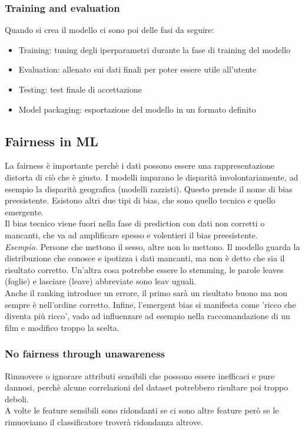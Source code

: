 \subsubsection{Training and evaluation}
Quando si crea il modello ci sono poi delle fasi da seguire:
\begin{itemize}
    \item Training: tuning degli iperparametri durante la fase di training del modello
    \item Evaluation: allenato sui dati finali per poter essere utile all'utente
    \item Testing: test finale di accettazione 
    \item Model packaging: esportazione del modello in un formato definito
\end{itemize}

\newpage

\subsection{Fairness in ML}
La fairness è importante perchè i dati possono essere una rappresentazione distorta di ciò che è giusto. I modelli imparano le disparità involontariamente, ad esempio la disparità geografica (modelli razzisti). Questo prende il nome di bias preesistente. Esistono altri due tipi di bias, che sono quello tecnico e quello emergente.
\\
Il bias tecnico viene fuori nella fase di prediction con dati non corretti o mancanti, che va ad amplificare spesso e volentieri il bias preesistente. \\
\textit{Esempio.} Persone che mettono il sesso, altre non lo mettono. Il modello guarda la distribuzione che conosce e ipotizza i dati mancanti, ma non è detto che sia il risultato corretto. Un'altra cosa potrebbe essere lo stemming, le parole leaves (foglie) e lasciare (leave) abbreviate sono leav uguali. 
\\
Anche il ranking introduce un errore, il primo sarà un risultato buono ma non sempre è nell'ordine corretto. Infine, l'emergent bias si manifesta come 'ricco che diventa più ricco', vado ad influenzare ad esempio nella raccomandazione di un film e modifico troppo la scelta. 

\subsubsection{No fairness through unawareness}
Rimuovere o ignorare attributi sensibili che possono essere inefficaci e pure dannosi, perchè alcune correlazioni del dataset potrebbero risultare poi troppo deboli. 
\\
A volte le feature sensibili sono ridondanti se ci sono altre feature però se le rimuoviamo il classificatore troverà ridondanza altrove. 

